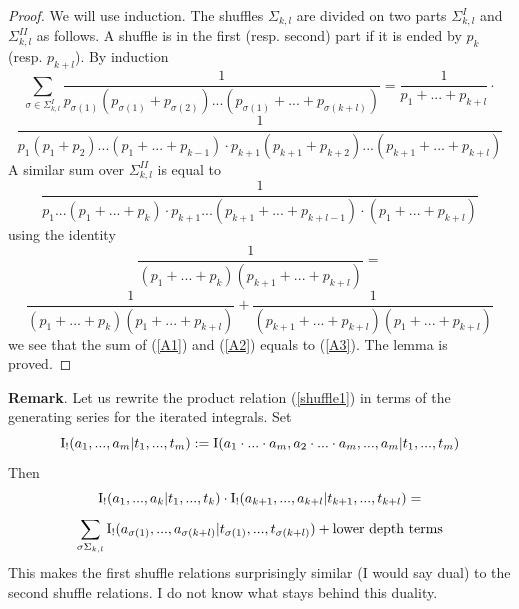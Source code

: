 \documentclass[10pt]{article}
\begin{document}
\begin{proof} We will use induction. The shuffles $\Sigma_{k,l}$ are divided on two parts 
$\Sigma^I_{k,l}$ and $\Sigma^{II}_{k,l}$ as follows. A shuffle is in the first (resp. second) 
part if it is ended by $p_k$ (resp. $p_{k+l}$). By induction
$$
\sum_{\sigma \in \Sigma^I_{k,l}} \frac{1}{p_{\sigma(1)}( p_{\sigma(1)} + p_{\sigma(2)} ) ... ( p_{\sigma(1)} + ... + p_{\sigma(k+l)} )} = \frac{1}{p_1+ ... + p_{k+l}}\cdot 
$$
\begin{equation} \label{A1}
\frac{1}{p_1 (p_1+p_2) ... (p_1+...+p_{k-1}) \cdot p_{k+1} (p_{k+1} + p_{k+2}) ... (p_{k+1} + ... + p_{k+l}) }
\end{equation} 
A similar sum over $\Sigma^{II}_{k,l}$ is equal to 
\begin{equation} \label{A2}
\frac{1}{p_1  ... (p_1+...+p_{k}) \cdot p_{k+1}  ... (p_{k+1} + ... + p_{k+l-1}) \cdot (p_1+ ... + p_{k+l})}
\end{equation} 
using the identity 
$$
\frac{1}{(p_1+...+p_{k})(p_{k+1} + ... + p_{k+l})} = 
$$
$$
\frac{1}{(p_1+...+p_{k})(p_{1} + ... + p_{k+l})} + 
 \frac{1}{(p_{k+1} + ... + p_{k+l})(p_{1} + ... + p_{k+l})} 
$$
we see that the sum of (\ref{A1}) and (\ref{A2}) equals  to  (\ref{A3}). The lemma is proved. 
  



\end{proof}

{\bf Remark}.  Let us rewrite the product relation (\ref{shuffle1}) in terms of the generating series for 
the iterated integrals. Set
$$
{\rm I}_!(a_1,...,a_m|t_1,...,t_m):= {\rm I}(a_1\cdot  ...\cdot a_m,a_2\cdot ...\cdot a_m,...,a_m|t_1, ..., t_m)
$$
Then 
$$
{\rm I}_!(a_1,...,a_k|t_1,...,t_k)\cdot {\rm I}_!(a_{k+1},...,a_{k+l}|t_{k+1},...,t_{k+l}) =
 $$
$$
\sum_{\sigma \Sigma_{k,l}}{\rm I}_! (a_{\sigma (1)},...,a_{\sigma (k+l) }|t_{\sigma ( 1) },...,t_{\sigma (k+l)}) + \mbox{lower depth terms}
$$
This makes the first shuffle relations surprisingly similar (I would say dual) to the second 
shuffle relations. I do not know what stays behind this duality. 
 
\end{document}
